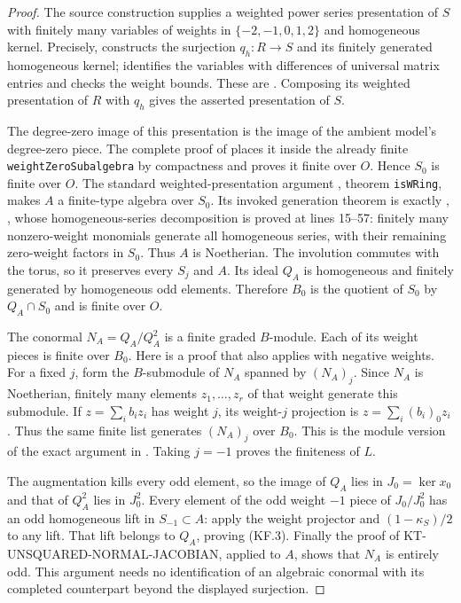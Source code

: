 \documentclass[11pt,a4paper]{article}
\theoremstyle{definition}
\begin{document}
\begin{proof}
The source construction supplies a weighted power series
presentation of $S$ with finitely many variables of
weights in $\{-2,-1,0,1,2\}$ and homogeneous kernel.
Precisely,  constructs the
surjection $q_h:R\to S$ and its finitely generated
homogeneous kernel;  identifies the
variables with differences of universal matrix entries
and checks the weight bounds.  These are
.
Composing its weighted presentation of $R$ with $q_h$
gives the asserted presentation of $S$.

The degree-zero image of this presentation is the image
of the ambient model's degree-zero piece.  The complete
proof of
places it inside the already finite
\texttt{weightZeroSubalgebra} by compactness and proves
it finite over $O$.  Hence $S_0$ is finite over $O$.
The standard weighted-presentation argument
, theorem
\texttt{isWRing}, makes $A$ a finite-type algebra over
$S_0$.  Its invoked generation theorem is exactly
, , whose
homogeneous-series decomposition is proved at lines
15--57: finitely many
nonzero-weight monomials generate all homogeneous
series, with their remaining zero-weight factors in
$S_0$.  Thus $A$ is Noetherian.  The involution commutes
with the torus, so it preserves every $S_j$ and $A$.
Its ideal $Q_A$ is homogeneous and finitely generated
by homogeneous odd elements.  Therefore $B_0$ is the
quotient of $S_0$ by $Q_A\cap S_0$ and is finite over $O$.

The conormal $N_A=Q_A/Q_A^2$ is a finite graded
$B$-module.  Each of its weight pieces is finite over
$B_0$.  Here is a proof that also applies with negative
weights.  For a fixed $j$, form the $B$-submodule of
$N_A$ spanned by $(N_A)_j$.  Since $N_A$ is Noetherian,
finitely many elements $z_1,\ldots,z_r$ of that weight
generate this submodule.  If
$z=\sum_i b_i z_i$ has weight $j$, its weight-$j$
projection is $z=\sum_i(b_i)_0z_i$.  Thus the same
finite list generates $(N_A)_j$ over $B_0$.  This is
the module version of the exact argument in
.
Taking $j=-1$ proves the finiteness of $L$.

The augmentation kills every odd element, so the image
of $Q_A$ lies in $J_0=\ker x_0$ and that of $Q_A^2$
lies in $J_0^2$.  Every element of the odd weight $-1$
piece of $J_0/J_0^2$ has an odd homogeneous lift in
$S_{-1}\subset A$: apply the weight projector and
$(1-\kappa_S)/2$ to any lift.  That lift belongs to
$Q_A$, proving (KF.3).  Finally the proof of
KT-UNSQUARED-NORMAL-JACOBIAN, applied to $A$, shows
that $N_A$ is entirely odd.  This argument needs no
identification of an algebraic conormal with its
completed counterpart beyond the displayed
surjection.
\end{proof}
\end{document}
